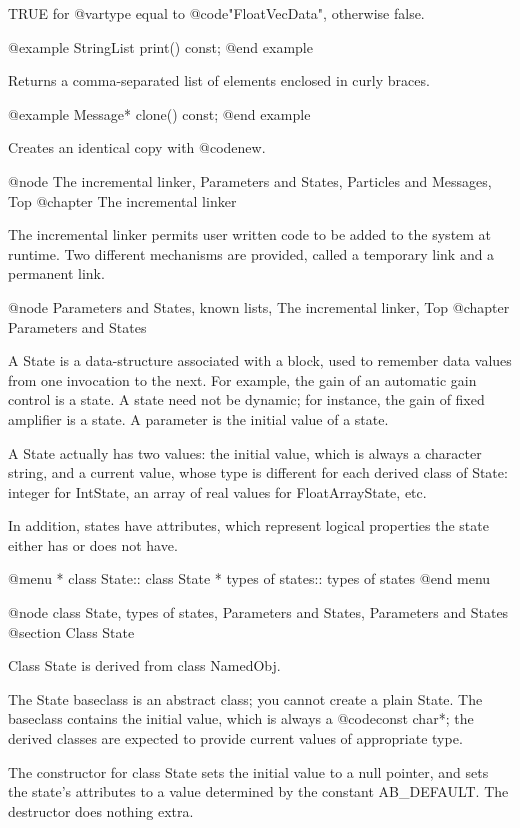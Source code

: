 TRUE for @var{type} equal to @code{"FloatVecData"}, otherwise false.

@example
StringList print() const;
@end example

Returns a comma-separated list of elements enclosed in curly braces.

@example
Message* clone() const;
@end example

Creates an identical copy with @code{new}.

@node The incremental linker, Parameters and States, Particles and Messages, Top
@chapter The incremental linker

The incremental linker permits user written code to be added to the
system at runtime.  Two different mechanisms are provided, called
a temporary link and a permanent link.

@node Parameters and States, known lists, The incremental linker, Top
@chapter Parameters and States

A State is a data-structure associated with a block, used to remember
data values from one invocation to the next.
For example, the gain of an automatic gain control is a state.
A state need not be dynamic; for instance, the gain of fixed
amplifier is a state.  A parameter is the initial value of a state.

A State actually has two values: the initial value, which is always
a character string, and a current value, whose type is different for
each derived class of State: integer for IntState, an array of real
values for FloatArrayState, etc.

In addition, states have attributes, which represent logical properties
the state either has or does not have.

@menu
* class State::                 class State
* types of states::             types of states
@end menu

@node class State, types of states, Parameters and States, Parameters and States
@section Class State

Class State is derived from class NamedObj.

The State baseclass is an abstract class; you cannot create a plain
State.  The baseclass contains the initial value, which is always
a @code{const char*}; the derived classes are expected to provide
current values of appropriate type.

The constructor for class State sets the initial value to a null
pointer, and sets the state's attributes to a value determined by
the constant AB_DEFAULT.  The destructor does nothing extra.

